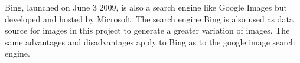 \documentclass[../ImageClassifier.tex]{subfiles}
\begin{document}
    Bing, launched on June 3 2009, is also a search engine like Google Images \parencite{google-images} but developed and hosted by Microsoft.
    The search engine Bing is also used as data source for images in this project to generate a greater variation of images.
    The same advantages and disadvantages apply to Bing as to the google image search engine.
\end{document}
